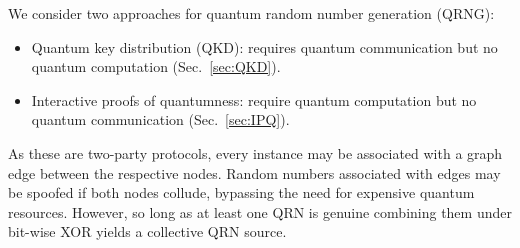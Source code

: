 \documentclass[twocolumn, aps, amsmath, amssymb, nofootinbib, superscriptaddress, longbibliography, floatfix, eqsecnum, rmp]{revtex4-2}
\begin{document}
We consider two approaches for quantum random number generation (QRNG):
\begin{itemize}
	\item Quantum key distribution (QKD): requires quantum communication but no quantum computation (Sec.~\ref{sec:QKD}).
	\item Interactive proofs of quantumness: require quantum computation but no quantum communication (Sec.~\ref{sec:IPQ}).
\end{itemize}

As these are two-party protocols, every instance may be associated with a graph edge between the respective nodes.  Random numbers associated with edges may be spoofed if both nodes collude, bypassing the need for expensive quantum resources. However, so long as at least one QRN is genuine combining them under bit-wise XOR yields a collective QRN source.

\end{document}
